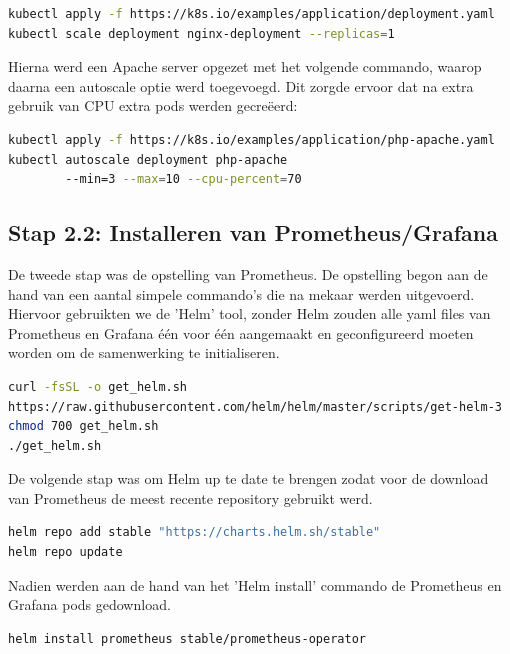 \begin{lstlisting}[language=bash,caption={nginx installatie}]
kubectl apply -f https://k8s.io/examples/application/deployment.yaml 
kubectl scale deployment nginx-deployment --replicas=1   
\end{lstlisting}

\clearpage
Hierna werd een Apache server opgezet met het volgende commando, waarop daarna een autoscale optie werd toegevoegd. Dit zorgde ervoor dat na extra gebruik van CPU extra pods werden gecreëerd:

\begin{lstlisting}[language=bash,caption={apache installatie}]
kubectl apply -f https://k8s.io/examples/application/php-apache.yaml
kubectl autoscale deployment php-apache 
        --min=3 --max=10 --cpu-percent=70
\end{lstlisting}


\subsection{Stap 2.2: Installeren van Prometheus/Grafana}

De tweede stap was de opstelling van Prometheus. De opstelling begon aan de hand van een aantal simpele commando's die na mekaar werden uitgevoerd. Hiervoor gebruikten we de 'Helm' tool, zonder Helm zouden alle yaml files van Prometheus en Grafana één voor één aangemaakt en geconfigureerd moeten worden om de samenwerking te initialiseren. 

\begin{lstlisting}[language=bash,caption={helm installatie}]
curl -fsSL -o get_helm.sh
https://raw.githubusercontent.com/helm/helm/master/scripts/get-helm-3
chmod 700 get_helm.sh
./get_helm.sh
\end{lstlisting}

De volgende stap was om Helm up te date te brengen zodat voor de download van Prometheus de meest recente repository gebruikt werd.


\begin{lstlisting}[language=bash,caption={helm repository update}]
helm repo add stable "https://charts.helm.sh/stable"
helm repo update
\end{lstlisting}

Nadien werden aan de hand van het 'Helm install' commando de Prometheus en Grafana pods gedownload.

\begin{lstlisting}[language=bash,caption={helm prometheus installatie}]
helm install prometheus stable/prometheus-operator
\end{lstlisting}

